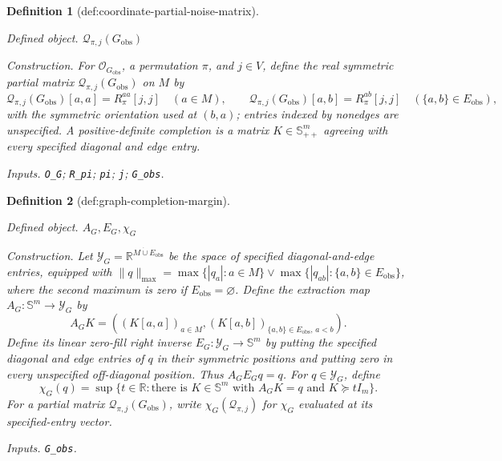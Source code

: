 \documentclass{article}
\newtheorem{definition}{Definition}
\begin{document}
\begin{definition}[def:coordinate-partial-noise-matrix]\label{def:coordinate-partial-noise-matrix}
\par\smallskip\noindent\emph{Defined object.} \(\mathcal Q_{\pi,j}(G_{\mathrm{obs}})\)
\par\smallskip\noindent\emph{Construction.} For \(\mathcal O_{G_{\mathrm{obs}}}\), a permutation \(\pi\), and \(j\in V\), define the real symmetric partial matrix \(\mathcal Q_{\pi,j}(G_{\mathrm{obs}})\) on \(M\) by
\[
\mathcal Q_{\pi,j}(G_{\mathrm{obs}})[a,a]=R_\pi^{aa}[j,j]
\quad(a\in M),
\qquad
\mathcal Q_{\pi,j}(G_{\mathrm{obs}})[a,b]
=R_\pi^{ab}[j,j]
\quad(\{a,b\}\in E_{\mathrm{obs}}),
\]
with the symmetric orientation used at \((b,a)\); entries indexed by nonedges are unspecified.  A positive-definite completion is a matrix \(K\in\mathbb S_{++}^m\) agreeing with every specified diagonal and edge entry.
\par\smallskip\noindent\emph{Inputs.} \texttt{O\_\allowbreak{}G}; \texttt{R\_\allowbreak{}pi}; \texttt{pi}; \texttt{j}; \texttt{G\_\allowbreak{}obs}.
\end{definition}

\begin{definition}[def:graph-completion-margin]\label{def:graph-completion-margin}
\par\smallskip\noindent\emph{Defined object.} \(A_G,E_G,\chi_G\)
\par\smallskip\noindent\emph{Construction.} Let \(\mathcal Y_G=\mathbb R^{M\mathbin{\dot\cup}E_{\mathrm{obs}}}\) be the space of specified diagonal-and-edge entries, equipped with \(\|q\|_{\max}=\max\{|q_a|:a\in M\}\vee\max\{|q_{ab}|:\{a,b\}\in E_{\mathrm{obs}}\}\), where the second maximum is zero if \(E_{\mathrm{obs}}=\varnothing\).  Define the extraction map \(A_G:\mathbb S^m\to\mathcal Y_G\) by
\[
A_GK=((K[a,a])_{a\in M},(K[a,b])_{\{a,b\}\in E_{\mathrm{obs}},\,a<b}).
\]
Define its linear zero-fill right inverse \(E_G:\mathcal Y_G\to\mathbb S^m\) by putting the specified diagonal and edge entries of \(q\) in their symmetric positions and putting zero in every unspecified off-diagonal position.  Thus \(A_GE_Gq=q\).  For \(q\in\mathcal Y_G\), define
\[
\chi_G(q)=\sup\{t\in\mathbb R:\text{there is }K\in\mathbb S^m\text{ with }A_GK=q\text{ and }K\succeq tI_m\}.
\]
For a partial matrix \(\mathcal Q_{\pi,j}(G_{\mathrm{obs}})\), write \(\chi_G(\mathcal Q_{\pi,j})\) for \(\chi_G\) evaluated at its specified-entry vector.
\par\smallskip\noindent\emph{Inputs.} \texttt{G\_\allowbreak{}obs}.
\end{definition}
\end{document}

